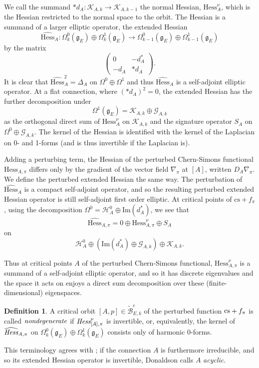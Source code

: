 \documentclass{memo-l}
\theoremstyle{definition}
\newtheorem{definition}[theorem]{Definition}
\theoremstyle{remark}
\numberwithin{section}{chapter}
\numberwithin{equation}{chapter}
\begin{document}
We call the summand $*d_A: \mathcal K_{A,k} \to \mathcal K_{A,k-1}$ the normal Hessian, $\text{Hess}^\nu_{A}$, which is the Hessian restricted to the normal space to the orbit. The Hessian is a summand of a larger elliptic operator, the extended Hessian 
$$\widehat{\text{Hess}}_A: \Omega^0_k(\mathfrak g_E) \oplus \Omega^1_k(\mathfrak g_E) \to \Omega^0_{k-1}(\mathfrak g_E) \oplus \Omega^1_{k-1}(\mathfrak g_E)$$ 
by the matrix 
\[\begin{pmatrix}0 & -d_A^* \\ - d_A & * d_A\end{pmatrix}.\] 
It is clear that $\widehat{\text{Hess}}_A^2 = \Delta_A$ on $\Omega^0 \oplus \Omega^1$ and thus $\widehat{\text{Hess}}_A$ is a self-adjoint elliptic operator. At a flat connection, where $(*d_A)^2 = 0$, the extended Hessian has the further decomposition under 
$$\Omega^1(\mathfrak g_E) = \mathcal K_{A,k} \oplus \mathcal G_{A,k}$$ 
as the orthogonal direct sum of $\text{Hess}^\nu_{A}$ on $\mathcal K_{A,k}$ and the signature operator $S_A$ on $\Omega^0 \oplus \mathcal G_{A,k}$. The kernel of the Hessian is identified with the kernel of the Laplacian on 0- and 1-forms (and is thus invertible if the Laplacian is).

Adding a perturbing term, the Hessian of the perturbed Chern-Simons functional $\text{Hess}_{A, \pi}$ differs only by the gradient of the vector field $\nabla_\pi$ at $[A]$, written $D_A \nabla_\pi$. We define the perturbed extended Hessian the same way. The perturbation of $\widehat{\text{Hess}}_{A}$ is a compact self-adjoint operator, and so the resulting perturbed extended Hessian operator is still self-adjoint first order elliptic. At critical points of $\text{cs}+f_\pi$, using the decomposition $\Omega^0 = \mathcal H^0_A \oplus \text{Im}(d_A^*)$, we see that 
$$\widehat{\text{Hess}}_{A,\pi} = 0 \oplus \text{Hess}_{A,\pi}^\nu \oplus S_A$$ 
on 
$$\mathcal H^0_A \oplus (\text{Im}(d_A^*) \oplus \mathcal G_{A,k}) \oplus \mathcal K_{A,k}.$$ 

Thus at critical points $A$ of the perturbed Chern-Simons functional, $\text{Hess}^\nu_{A,\pi}$ is a summand of a self-adjoint elliptic operator, and so it has discrete eigenvalues and the space it acts on enjoys a direct sum decomposition over these (finite-dimensional) eigenspaces.

\begin{definition}A critical orbit $[A,p] \in \widetilde{\mathcal B}^e_{E,k}$ of the perturbed function $\textup{cs} + f_\pi$ is called $\text{\em{nondegenerate}}$ if $\text{\em{Hess}}^\nu_{[A],\pi}$ is invertible, or, equivalently, the kernel of $\widehat{\text{\em{Hess}}}_{A,\pi}$ on $\Omega^0_k(\mathfrak g_E) \oplus \Omega^1_k(\mathfrak g_E)$ consists only of harmonic 0-forms.\end{definition}
This terminology agrees with \cite{Don}; if the connection $A$ is furthermore irreducible, and so its extended Hessian operator is invertible, Donaldson calls $A$ \textit{acyclic}.
\end{document}
